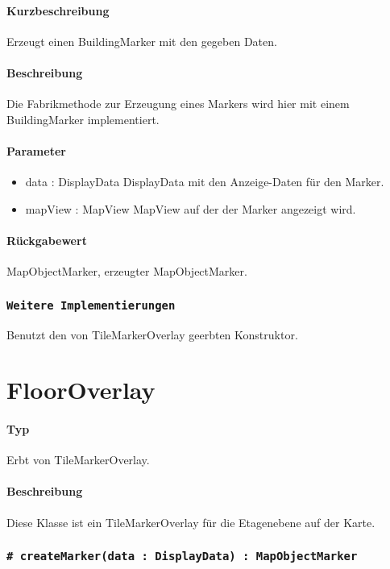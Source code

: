 \paragraph*{Kurzbeschreibung}
Erzeugt einen BuildingMarker mit den gegeben Daten.
\paragraph*{Beschreibung}
Die Fabrikmethode zur Erzeugung eines Markers wird hier mit einem BuildingMarker implementiert.
\paragraph*{Parameter}
\begin{itemize}
    \item data : DisplayData DisplayData mit den Anzeige-Daten für den Marker.
    \item mapView : MapView MapView auf der der Marker angezeigt wird.
\end{itemize}
\paragraph*{Rückgabewert}
MapObjectMarker, erzeugter MapObjectMarker.

\subsubsection{\texttt{Weitere Implementierungen}}%
Benutzt den von TileMarkerOverlay geerbten Konstruktor.

\section{FloorOverlay}
\paragraph*{Typ}
Erbt von TileMarkerOverlay.
\paragraph*{Beschreibung}
Diese Klasse ist ein TileMarkerOverlay für die Etagenebene auf der Karte.

\subsubsection{\texttt{# createMarker(data : DisplayData) : MapObjectMarker}}%
